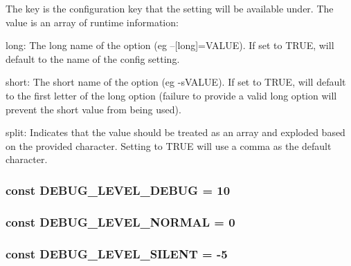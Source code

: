 The key is the configuration key that the setting will be available under. The value is an array of runtime information\-:
\begin{DoxyItemize}
\item long\-: The long name of the option (eg --\mbox{[}long\mbox{]}=V\-A\-L\-U\-E). If set to T\-R\-U\-E, will default to the name of the config setting.
\item short\-: The short name of the option (eg -\/s\-V\-A\-L\-U\-E). If set to T\-R\-U\-E, will default to the first letter of the long option (failure to provide a valid long option will prevent the short value from being used).
\item split\-: Indicates that the value should be treated as an array and exploded based on the provided character. Setting to T\-R\-U\-E will use a comma as the default character. 
\end{DoxyItemize}\hypertarget{common_8php_a081b2a8b4f0b1d1216fd2f143c8bc1a6}{
\subsubsection[{D\-E\-B\-U\-G\-\_\-\-L\-E\-V\-E\-L\-\_\-\-D\-E\-B\-U\-G}]{\setlength{\rightskip}{0pt plus 5cm}const D\-E\-B\-U\-G\-\_\-\-L\-E\-V\-E\-L\-\_\-\-D\-E\-B\-U\-G = 10}}\label{common_8php_a081b2a8b4f0b1d1216fd2f143c8bc1a6}
\hypertarget{common_8php_a412f8ed486afa7fea7c81b35d0db39ba}{
\subsubsection[{D\-E\-B\-U\-G\-\_\-\-L\-E\-V\-E\-L\-\_\-\-N\-O\-R\-M\-A\-L}]{\setlength{\rightskip}{0pt plus 5cm}const D\-E\-B\-U\-G\-\_\-\-L\-E\-V\-E\-L\-\_\-\-N\-O\-R\-M\-A\-L = 0}}\label{common_8php_a412f8ed486afa7fea7c81b35d0db39ba}
\hypertarget{common_8php_ad716f4611d7ac151f96d2ff10f681786}{
\subsubsection[{D\-E\-B\-U\-G\-\_\-\-L\-E\-V\-E\-L\-\_\-\-S\-I\-L\-E\-N\-T}]{\setlength{\rightskip}{0pt plus 5cm}const D\-E\-B\-U\-G\-\_\-\-L\-E\-V\-E\-L\-\_\-\-S\-I\-L\-E\-N\-T = -\/5}}\label{common_8php_ad716f4611d7ac151f96d2ff10f681786}

